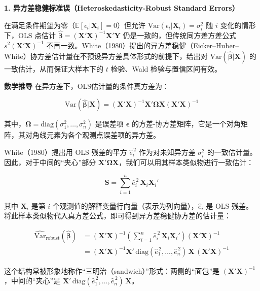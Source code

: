 \textbf{1. 异方差稳健标准误（Heteroskedasticity-Robust Standard Errors）}

在满足条件期望为零（$\mathbb{E}[\epsilon_i|\bm{X}_i]=0$）但允许 $\mathrm{Var}(\epsilon_i|\bm{X}_i)=\sigma_i^2$ 随 $i$ 变化的情形下，OLS 点估计 $\hat{\bm{\beta}}=(\bm{X}'\bm{X})^{-1}\bm{X}'\bm{Y}$ 仍是一致的，但传统同方差方差公式 $s^2(\bm{X}'\bm{X})^{-1}$ 不再一致。White（1980）提出的异方差稳健（Eicker–Huber–White）协方差估计量在不预设异方差具体形式的前提下，给出对 $\mathrm{Var}(\hat{\bm{\beta}}|\bm{X})$ 的一致估计，从而保证大样本下的 $t$ 检验、Wald 检验与置信区间有效。

\textbf{数学推导}
在异方差下，OLS估计量的条件真方差为：

\begin{equation}
	\mathrm{Var}(\hat{\bm{\beta}}|\bm{X}) = (\bm{X}'\bm{X})^{-1}\bm{X}'\bm{\Omega}\bm{X}(\bm{X}'\bm{X})^{-1}
\end{equation}

其中，$\bm{\Omega} = \mathrm{diag}(\sigma_1^2,\dots,\sigma_n^2)$ 是误差项 $\bm{\epsilon}$ 的方差-协方差矩阵，它是一个对角矩阵，其对角线元素为各个观测点误差项的异方差。

White（1980）提出用 OLS 残差的平方 $\hat{e}_i^{\,2}$ 作为对未知异方差 $\sigma_i^2$ 的一致估计量。因此，对于中间的“夹心”部分 $\bm{X}'\bm{\Omega}\bm{X}$，我们可以用其样本类似物进行一致估计：

\begin{equation}
	\widehat{\bm{S}} = \sum_{i=1}^n \hat e_i^{\,2}\,\bm{X}_i\bm{X}_i'
\end{equation}

其中 $\bm{X}_i$ 是第 $i$ 个观测值的解释变量行向量（表示为列向量），$\hat e_i$ 是 OLS 残差。
将此样本类似物代入真方差公式，即可得到异方差稳健协方差的估计量：

\begin{equation}
	\begin{split}
		\widehat{\mathrm{Var}}_{\mathrm{robust}}(\hat{\bm{\beta}})
		&= (\bm{X}'\bm{X})^{-1}\left(\sum_{i=1}^n \hat e_i^{\,2}\,\bm{X}_i\bm{X}_i'\right)(\bm{X}'\bm{X})^{-1} \\
		&= (\bm{X}'\bm{X})^{-1}\bm{X}'\,\mathrm{diag}(\hat e_1^{\,2},\dots,\hat e_n^{\,2})\,\bm{X}\,(\bm{X}'\bm{X})^{-1}
	\end{split}
\end{equation}

这个结构常被形象地称作“三明治（sandwich）”形式：两侧的“面包”是 $(\bm{X}'\bm{X})^{-1}$，中间的“夹心”是 $\bm{X}'\,\mathrm{diag}(\hat e_1^{\,2},\dots,\hat e_n^{\,2})\,\bm{X}$。

